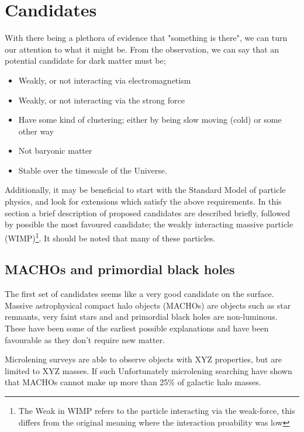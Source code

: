 \section{Candidates}
\par
With there being a plethora of evidence that "something is there", we can turn our attention to what it might be.
From the observation, we can say that an potential candidate for dark matter must be;
\begin{itemize}
    \item Weakly, or not interacting via electromagnetism 
    \item Weakly, or not interacting via the strong force
    \item Have some kind of clustering; either by being slow moving (cold) or some other way
    \item Not baryonic matter
    \item Stable over the timescale of the Universe.
\end{itemize}
Additionally, it may be beneficial to start with the Standard Model of particle physics, and look for extensions which satisfy the above requirements.
In this section a brief description of proposed candidates are described briefly, followed by possible the most favoured candidate; the weakly interacting massive particle (WIMP)\footnote{The Weak in WIMP refers to the particle interacting via the weak-force, this differs from the original meaning where the interaction proability was low}.
It should be noted that many of these particles.

\subsection{MACHOs and primordial black holes}
\par
The first set of candidates seems like a very good candidate on the surface.
Massive astrophysical compact halo objects (MACHOs) are objects such as star remnants, very faint stars and 
and primordial black holes are non-luminous.
These have been some of the earliest possible explanations and have been favourable as they don't require new matter.

\par
Microlening surveys are able to observe objects with XYZ properties, but are limited to XYZ masses.
If such 
Unfortunately microlening searching have shown that MACHOs cannot make up more than 25\% of galactic halo masses.

